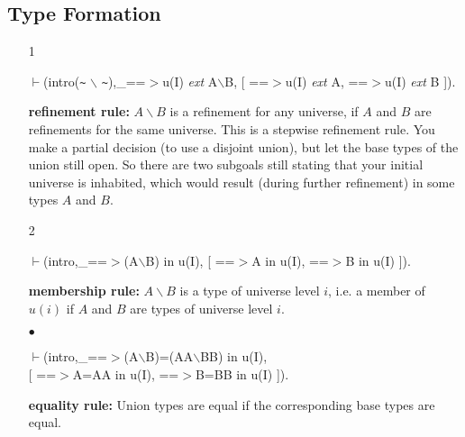 \documentclass[11pt]{report}
\begin{document}
 \subsection{Type Formation}
 \begin{enumerate}
 \item[1]
\begin{sf}\begin{tabbing}
$\vdash$(intro({\verb`~`} $\backslash$ {\verb`~`}),\_\hspace{0.1em}==$>$u(I) \mbox{\it ext} A$\backslash$B, [ ==$>$u(I) \mbox{\it ext} A, ==$>$u(I) \mbox{\it ext} B ]).
\end{tabbing}\end{sf}

 {\bf refinement rule:} 
 $A\backslash B$ is a refinement
 for any universe, if $A$ and $B$ are refinements for the
 same universe. This is a stepwise
 refinement rule. You make a partial decision (to use a disjoint union),
 but let the base types of the union still open. So there are two 
 subgoals still stating that your initial universe is inhabited,
 which would result (during further refinement) in some types $A$ and
 $B$.
  
 \item[2]
\begin{sf}\begin{tabbing}
$\vdash$(intro,\_\hspace{0.1em}==$>$(A$\backslash$B) in u(I), [ ==$>$A in u(I), ==$>$B in u(I) ]).
\end{tabbing}\end{sf}

 {\bf membership rule:} 
 $A\backslash B$ is a type of universe level $i$,
 i.e. a member of $u(i)$ if $A$ and $B$ are types of universe level $i$.
  
 \item[$\bullet$]
\begin{sf}\begin{tabbing}
$\vdash$(intro,\_\hspace{0.1em}==$>$(A$\backslash$B)=(AA$\backslash$BB) in u(I),\\[-0.15ex]
\hspace{2em}[ ==$>$A=AA in u(I), ==$>$B=BB in u(I) ]).
\end{tabbing}\end{sf}

 {\bf equality rule:}
 Union types are equal if the corresponding base types are equal.
 \end{enumerate}
  
\end{document}
